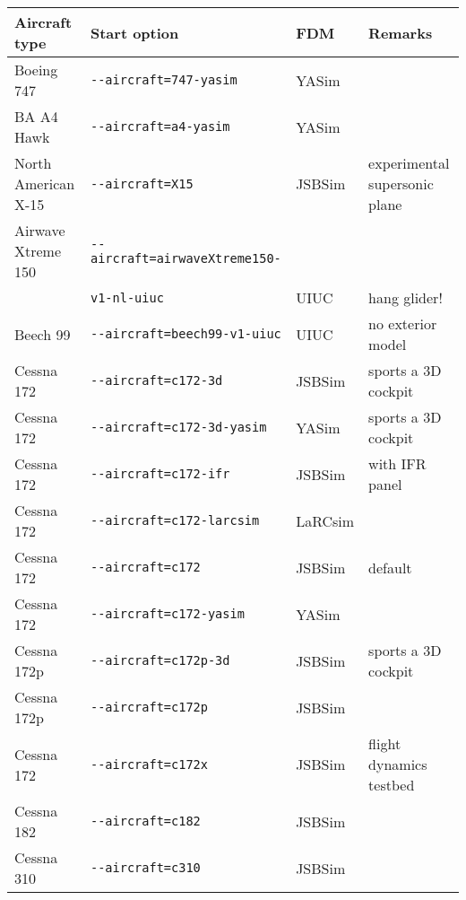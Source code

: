 \begin{tabular}{l|l|l|l}
Aircraft type		&   Start option								&	FDM		&		Remarks\\\hline
   Boeing 747		&		\texttt{-$ $-aircraft=747-yasim}                   
   &  YASim &           \\
   BA A4 Hawk&		\texttt{-$ $-aircraft=a4-yasim}                    
   &  YASim &           \\
   North American X-15		&		\texttt{-$ $-aircraft=X15}                         
   &  JSBSim & experimental supersonic plane      \\
   Airwave Xtreme 150 &		\texttt{-$ $-aircraft=airwaveXtreme150-} 
   &          \\
   													&		\texttt{v1-nl-uiuc} 
   & UIUC & hang glider!          \\
   Beech 99			&		\texttt{-$ $-aircraft=beech99-v1-uiuc}             
   & UIUC & no exterior model          \\
   Cessna 172 &		\texttt{-$ $-aircraft=c172-3d}                     
   & JSBSim & sports a 3D cockpit          \\
   Cessna 172	&		\texttt{-$ $-aircraft=c172-3d-yasim}               
   & 	YASim & sports a 3D cockpit          \\
   Cessna 172	&		\texttt{-$ $-aircraft=c172-ifr}                    
   & JSBSim & with IFR panel           \\
   Cessna 172						&		\texttt{-$ $-aircraft=c172-larcsim}                
   &  LaRCsim &           \\
   Cessna 172						&		\texttt{-$ $-aircraft=c172}                        
   & JSBSim & default          \\
   Cessna 172						&		\texttt{-$ $-aircraft=c172-yasim}                  
   &  YASim &           \\
   Cessna 172p	&		\texttt{-$ $-aircraft=c172p-3d}                    
   & JSBSim & sports a 3D cockpit          \\
   Cessna 172p						&		\texttt{-$ $-aircraft=c172p}                       
   & JSBSim &           \\
   Cessna 172 & 	\texttt{-$ $-aircraft=c172x}                       
   & JSBSim & flight dynamics testbed          \\
   Cessna 182					&		\texttt{-$ $-aircraft=c182}                        
   & JSBSim &           \\
   Cessna 310					&		\texttt{-$ $-aircraft=c310}                        
   & JSBSim &           \\

\end{tabular}
